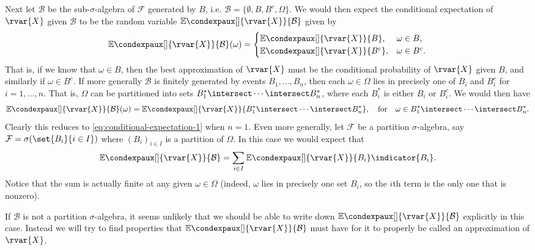 \documentclass[article, a4paper, 11pt, oneside]{memoir}
\numberwithin{equation}{chapter}
\newcommand{\calB}{\mathcal{B}}
\newcommand{\calF}{\mathcal{F}}
\newcommand{\condexp}[3][]{{\mathbb{E}\condexpaux[#1]{#2}{#3}}}
\begin{document}
Next let $\calB$ be the sub-$\sigma$-algebra of $\calF$ generated by $B$, i.e. $\calB = \{ \emptyset, B, B^c, \Omega \}$. We would then expect the conditional expectation of $\rvar{X}$ given $\calB$ to be the random variable $\condexp{\rvar{X}}{\calB}$ given by
%
\begin{equation}
    \label{eq:conditional-expectation-1}
    \condexp{\rvar{X}}{\calB}(\omega)
        =
        \begin{cases}
            \condexp{\rvar{X}}{B},   & \omega \in B, \\
            \condexp{\rvar{X}}{B^c}, & \omega \in B^c.
        \end{cases}
\end{equation}
%
That is, if we know that $\omega \in B$, then the best approximation of $\rvar{X}$ must be the conditional probability of $\rvar{X}$ given $B$, and similarly if $\omega \in B^c$. If more generally $\calB$ is finitely generated by events $B_1, \ldots, B_n$, then each $\omega \in \Omega$ lies in precisely one of $B_i$ and $B_i^c$ for $i = 1, \ldots, n$. That is, $\Omega$ can be partitioned into sets $B_1^* \intersect \cdots \intersect B_n^*$, where each $B_i^*$ is either $B_i$ or $B_i^c$. We would then have
%
\begin{equation*}
    \condexp{\rvar{X}}{\calB}(\omega)
        = \condexp{\rvar{X}}{ B_1^* \intersect \cdots \intersect B_n^* },
        \quad \text{for} \quad
        \omega \in B_1^* \intersect \cdots \intersect B_n^*.
\end{equation*}
%
Clearly this reduces to \cref{eq:conditional-expectation-1} when $n = 1$. Even more generally, let $\calF$ be a partition $\sigma$-algebra, say $\calF = \sigma( \set{B_i}{i \in I} )$ where $(B_i)_{i \in I}$ is a partition of $\Omega$. In this case we would expect that
%
\begin{equation*}
    \condexp{\rvar{X}}{\calB}
        = \sum_{i \in I} \condexp{\rvar{X}}{B_i} \indicator{B_i}.
\end{equation*}
%
Notice that the sum is actually finite at any given $\omega \in \Omega$ (indeed, $\omega$ lies in precisely one set $B_i$, so the $i$th term is the only one that is nonzero).

If $\calB$ is not a partition $\sigma$-algebra, it seems unlikely that we should be able to write down $\condexp{\rvar{X}}{\calB}$ explicitly in this case. Instead we will try to find properties that $\condexp{\rvar{X}}{\calB}$ must have for it to properly be called an approximation of $\rvar{X}$.
\end{document}
